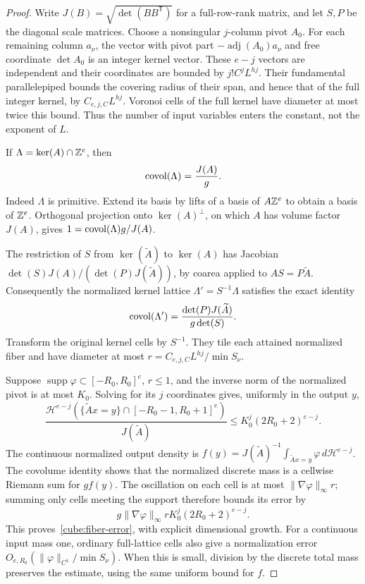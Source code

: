 \begin{proof}
Write $J(B)=\sqrt{\det(BB^{\mathsf T})}$ for a full-row-rank matrix,
and let $S,P$ be the diagonal scale matrices.  Choose a nonsingular
$j$-column pivot $A_0$.  For each remaining column $a_\nu$, the
vector with pivot part $-\operatorname{adj}(A_0)a_\nu$ and free
coordinate $\det A_0$ is an integer kernel vector.  These $e-j$
vectors are independent and their coordinates are bounded by
$j!C^jL^{hj}$.  Their fundamental parallelepiped bounds the covering
radius of their span, and hence that of the full integer kernel, by
$C_{e,j,C}L^{hj}$.  Voronoi cells of the full kernel have diameter
at most twice this bound.  Thus the number of input variables enters
the constant, not the exponent of $L$.

If $\Lambda=\ker(A)\cap\mathbb Z^e$, then
\begin{equation}
 \operatorname{covol}(\Lambda)=\frac{J(A)}{g}.
 \label{cube:kernel-covolume}
\end{equation}
Indeed $\Lambda$ is primitive.  Extend its basis by lifts of a basis
of $A\mathbb Z^e$ to obtain a basis of $\mathbb Z^e$.  Orthogonal projection onto
$\ker(A)^\perp$, on which $A$ has volume factor $J(A)$, gives
$1=\operatorname{covol}(\Lambda)g/J(A)$.

The restriction of $S$ from $\ker(\widetilde A)$ to $\ker(A)$ has
Jacobian $\det(S)J(A)/(\det(P)J(\widetilde A))$, by coarea applied
to $AS=P\widetilde A$.  Consequently the normalized kernel lattice
$\Lambda'=S^{-1}\Lambda$ satisfies the exact identity
\[
 \operatorname{covol}(\Lambda')=
 \frac{\det(P)J(\widetilde A)}{g\det(S)}.
\]
Transform the original kernel cells by $S^{-1}$.  They tile each
attained normalized fiber and have diameter at most
$r=C_{e,j,C}L^{hj}/\min S_\nu$.

Suppose $\operatorname{supp}\varphi\subset[-R_0,R_0]^e$, $r\le1$,
and the inverse norm of the normalized pivot is at most $K_0$.
Solving for its $j$ coordinates gives, uniformly in the output $y$,
\[
 \frac{\mathcal H^{e-j}
  (\{\widetilde Ax=y\}\cap[-R_0-1,R_0+1]^e)}
      {J(\widetilde A)}
 \le K_0^j(2R_0+2)^{e-j}.
\]
The continuous normalized output density is
$f(y)=J(\widetilde A)^{-1}\int_{\widetilde Ax=y}\varphi\,
d\mathcal H^{e-j}$.  The covolume identity shows that the
normalized discrete mass is a cellwise Riemann sum for $g f(y)$.
The oscillation on each cell is at most
$\|\nabla\varphi\|_\infty r$; summing only cells meeting the
support therefore bounds its error by
\[
 g\|\nabla\varphi\|_\infty r K_0^j(2R_0+2)^{e-j}.
\]
This proves~\eqref{cube:fiber-error}, with explicit dimensional
growth.  For a continuous input mass one, ordinary full-lattice
cells also give a normalization error
$O_{e,R_0}(\|\varphi\|_{C^1}/\min S_\nu)$.  When this is small,
division by the discrete total mass preserves the estimate, using
the same uniform bound for $f$.
\end{proof}

